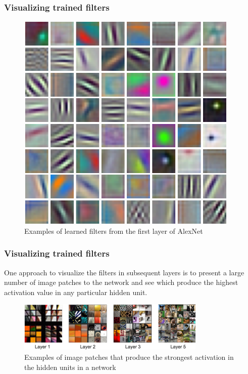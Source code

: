 \documentclass{beamer}
\begin{document}
\begin{frame}
    \frametitle{Visualizing trained filters}
    \begin{figure}
        \caption{Examples of learned filters from the first layer of AlexNet}
        \includegraphics[height=0.7\textheight]{Figure_12.pdf}
    \end{figure}
\end{frame}

\begin{frame}
    \frametitle{Visualizing trained filters}
    One approach to visualize the filters in subsequent layers is to present a large number of image patches to the network and see which produce the highest activation value in any particular hidden unit.
    \begin{figure}
        \caption{Examples of image patches that produce the strongest activation in the hidden units in a network}
        \includegraphics[width=0.8\textwidth]{Figure_13.pdf}
    \end{figure}
\end{frame}
\end{document}
